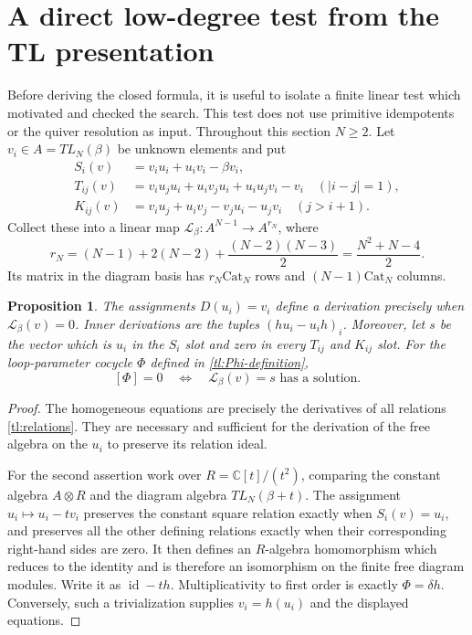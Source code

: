 \documentclass[a4paper,11pt,oneside,reqno]{amsart}
\newtheorem{proposition}[theorem]{Proposition}
\theoremstyle{definition}
\numberwithin{equation}{section}
\begin{document}
	\section{A direct low-degree test from the TL presentation}\label{tl:direct}
	Before deriving the closed formula, it is useful to isolate a finite
	linear test which motivated and checked the search.  This test does
	not use primitive idempotents or the quiver resolution as input.
	Throughout this section $N\ge2$. Let $v_i\in A=TL_N(\beta)$ be unknown elements and put
	\begin{align}
		S_i(v)&=v_i u_i+u_i v_i-\beta v_i,\label{tl:S}\\
		T_{ij}(v)&=v_i u_j u_i+u_i v_j u_i+u_i u_j v_i-v_i
		\quad(|i-j|=1),\label{tl:T}\\
		K_{ij}(v)&=v_i u_j+u_i v_j-v_j u_i-u_j v_i
		\quad(j>i+1).\label{tl:K}
	\end{align}
	Collect these into a linear map $\mathcal L_\beta:A^{N-1}\to A^{r_N}$,
	where
	\[
	r_N=(N-1)+2(N-2)+\frac{(N-2)(N-3)}2
	=\frac{N^2+N-4}2.
	\]
	Its matrix in the diagram basis has
	$r_N\mathrm{Cat}_N$ rows and $(N-1)\mathrm{Cat}_N$ columns.
	
	\begin{proposition}\label{tl:direct-test}
		The assignments $D(u_i)=v_i$ define a derivation precisely when
		$\mathcal L_\beta(v)=0$.  Inner derivations are the tuples
		$(hu_i-u_ih)_i$.  Moreover, let $s$ be the vector which is $u_i$
		in the $S_i$ slot and zero in every $T_{ij}$ and $K_{ij}$ slot.
		For the loop-parameter cocycle $\Phi$ defined in
		\eqref{tl:Phi-definition},
		\begin{equation}\label{tl:inhomogeneous-test}
			[\Phi]=0\quad\Longleftrightarrow\quad
			\mathcal L_\beta(v)=s\text{ has a solution}.
		\end{equation}
	\end{proposition}
	\begin{proof}
		The homogeneous equations are precisely the derivatives of all
		relations \eqref{tl:relations}.  They are necessary and sufficient
		for the derivation of the free algebra on the $u_i$ to preserve its
		relation ideal.
		
		For the second assertion work over $R=\mathbb C[t]/(t^2)$, comparing
		the constant algebra $A\otimes R$ and the diagram algebra
		$TL_N(\beta+t)$.  The assignment $u_i\mapsto u_i-tv_i$ preserves
		the constant square relation exactly when
		$S_i(v)=u_i$, and preserves all the other defining relations exactly
		when their corresponding right-hand sides are zero.  It then defines
		an $R$-algebra homomorphism which reduces to the identity and is
		therefore an isomorphism on the finite free diagram modules.  Write it
		as $\operatorname{id}-th$.  Multiplicativity to first order is exactly
		$\Phi=\delta h$.  Conversely, such a trivialization supplies
		$v_i=h(u_i)$ and the displayed equations.
	\end{proof}
	
\end{document}
